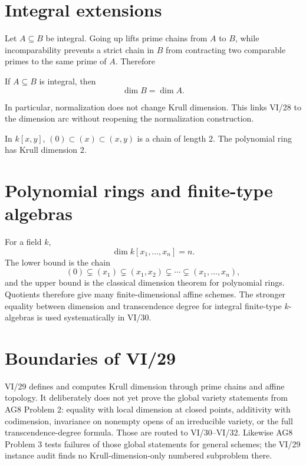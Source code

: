 

\section{Integral extensions}
Let $A\subseteq B$ be integral.  Going up lifts prime chains from $A$ to $B$, while incomparability prevents a strict
chain in $B$ from contracting two comparable primes to the same prime of $A$.  Therefore
\begin{theorem}\label{thm:vi29-integral-dimension}
If $A\subseteq B$ is integral, then
\[
\dim B=\dim A.
\]
\end{theorem}
In particular, normalization does not change Krull dimension.  This links VI/28 to the dimension arc without
reopening the normalization construction.



\begin{example}\label{ex:vi29-expand-03}
In $k[x,y]$, $(0)\subset(x)\subset(x,y)$ is a chain of length $2$.  The polynomial ring has Krull dimension $2$.
\end{example}
\section{Polynomial rings and finite-type algebras}
For a field $k$,
\[
\dim k[x_1,\ldots,x_n]=n.
\]
The lower bound is the chain
\[
(0)\subsetneq(x_1)\subsetneq(x_1,x_2)\subsetneq\cdots\subsetneq(x_1,\ldots,x_n),
\]
and the upper bound is the classical dimension theorem for polynomial rings.  Quotients therefore give many
finite-dimensional affine schemes.  The stronger equality between dimension and transcendence degree for integral
finite-type $k$-algebras is used systematically in VI/30.



\section{Boundaries of VI/29}
VI/29 defines and computes Krull dimension through prime chains and affine topology.  It deliberately does not yet
prove the global variety statements from AG8 Problem 2: equality with local dimension at closed points, additivity
with codimension, invariance on nonempty opens of an irreducible variety, or the full transcendence-degree formula.
Those are routed to VI/30--VI/32.  Likewise AG8 Problem 3 tests failures of those global statements for general
schemes; the VI/29 instance audit finds no Krull-dimension-only numbered subproblem there.

